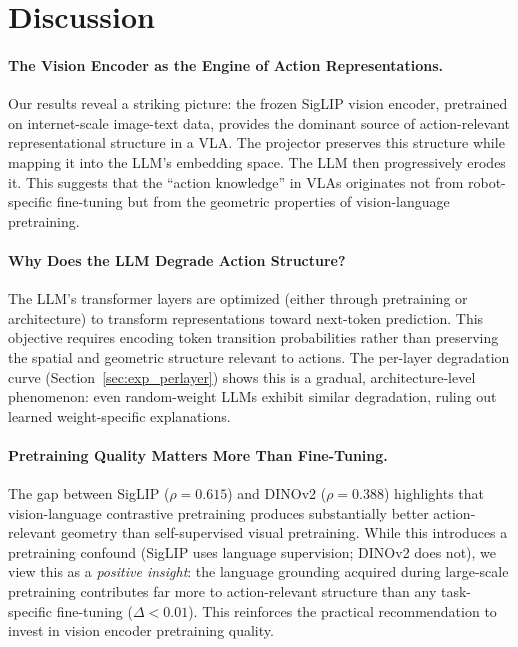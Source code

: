 \documentclass[10pt,letterpaper]{article}
\begin{document}
\section{Discussion}
\label{sec:discussion}

\paragraph{The Vision Encoder as the Engine of Action Representations.}
Our results reveal a striking picture: the frozen SigLIP vision encoder, pretrained on internet-scale image-text data, provides the dominant source of action-relevant representational structure in a VLA.
The projector preserves this structure while mapping it into the LLM's embedding space.
The LLM then progressively erodes it.
This suggests that the ``action knowledge'' in VLAs originates not from robot-specific fine-tuning but from the geometric properties of vision-language pretraining.

\paragraph{Why Does the LLM Degrade Action Structure?}
The LLM's transformer layers are optimized (either through pretraining or architecture) to transform representations toward next-token prediction.
This objective requires encoding token transition probabilities rather than preserving the spatial and geometric structure relevant to actions.
The per-layer degradation curve (Section~\ref{sec:exp_perlayer}) shows this is a gradual, architecture-level phenomenon: even random-weight LLMs exhibit similar degradation, ruling out learned weight-specific explanations.

\paragraph{Pretraining Quality Matters More Than Fine-Tuning.}
The gap between SigLIP ($\rho{=}0.615$) and DINOv2 ($\rho{=}0.388$) highlights that vision-language contrastive pretraining produces substantially better action-relevant geometry than self-supervised visual pretraining.
While this introduces a pretraining confound (SigLIP uses language supervision; DINOv2 does not), we view this as a \emph{positive insight}: the language grounding acquired during large-scale pretraining contributes far more to action-relevant structure than any task-specific fine-tuning ($\Delta{<}0.01$).
This reinforces the practical recommendation to invest in vision encoder pretraining quality.
\end{document}
